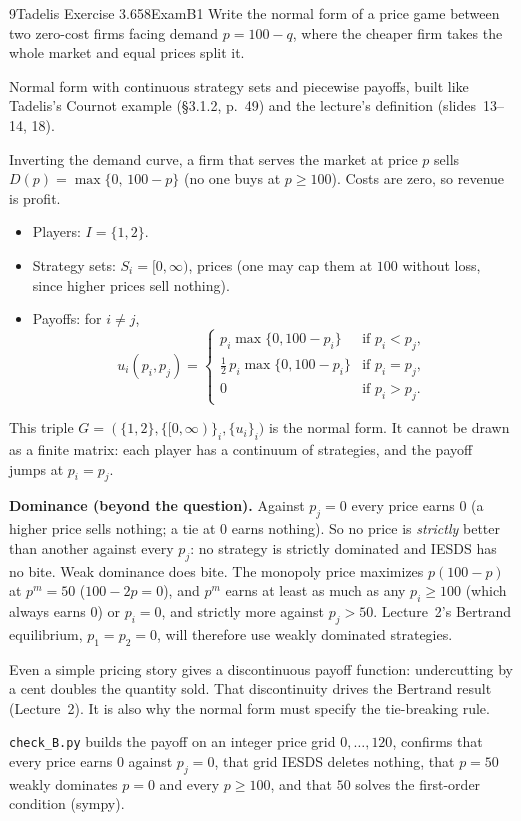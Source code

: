 \begin{exsol}{9}{Tadelis Exercise 3.6}{58}{Exam}{B1}
\asked Write the normal form of a price game between two zero-cost firms facing demand
$p = 100 - q$, where the cheaper firm takes the whole market and equal prices split it.

\method Normal form with continuous strategy sets and piecewise payoffs, built like Tadelis's
Cournot example (\S3.1.2, p.~49) and the lecture's definition (slides~13--14, 18).

\solution
Inverting the demand curve, a firm that serves the market at price $p$ sells
$D(p) = \max\{0,\, 100 - p\}$ (no one buys at $p \ge 100$). Costs are zero, so revenue is profit.
\begin{itemize}
  \item Players: $I = \{1, 2\}$.
  \item Strategy sets: $S_i = [0, \infty)$, prices (one may cap them at $100$ without loss,
  since higher prices sell nothing).
  \item Payoffs: for $i \ne j$,
  \[
    u_i(p_i, p_j) =
    \begin{cases}
      p_i \max\{0, 100 - p_i\} & \text{if } p_i < p_j,\\[2pt]
      \tfrac12\, p_i \max\{0, 100 - p_i\} & \text{if } p_i = p_j,\\[2pt]
      0 & \text{if } p_i > p_j.
    \end{cases}
  \]
\end{itemize}
This triple $G = (\{1,2\}, \{[0,\infty)\}_{i}, \{u_i\}_{i})$ is the normal form. It cannot be
drawn as a finite matrix: each player has a continuum of strategies, and the payoff jumps at
$p_i = p_j$.

\textbf{Dominance (beyond the question).} Against $p_j = 0$ every price earns $0$ (a higher
price sells nothing; a tie at $0$ earns nothing). So no price is \emph{strictly} better than
another against every $p_j$: no strategy is strictly dominated and IESDS has no bite. Weak
dominance does bite. The monopoly price maximizes $p(100 - p)$ at $p^m = 50$
($100 - 2p = 0$), and $p^m$ earns at least as much as any $p_i \ge 100$ (which always earns 0)
or $p_i = 0$, and strictly more against $p_j > 50$. Lecture~2's Bertrand equilibrium,
$p_1 = p_2 = 0$, will therefore use weakly dominated strategies.

\interp Even a simple pricing story gives a discontinuous payoff function: undercutting by
a cent doubles the quantity sold. That discontinuity drives the Bertrand result
(Lecture~2). It is also why the normal form must specify the tie-breaking rule.

\verify \texttt{check\_B.py} builds the payoff on an integer price grid $0, \dots, 120$,
confirms that every price earns 0 against $p_j = 0$, that grid IESDS deletes nothing, that
$p = 50$ weakly dominates $p = 0$ and every $p \ge 100$, and that $50$ solves the first-order
condition (sympy).

\answer{$I = \{1,2\}$, $S_i = [0, \infty)$, and $u_i(p_i, p_j) = p_i \max\{0, 100 - p_i\}$ if
$p_i < p_j$, half of that if $p_i = p_j$, and $0$ if $p_i > p_j$. No strategy is strictly
dominated; prices $0$ and $\ge 100$ are weakly dominated by $50$.}
\end{exsol}
